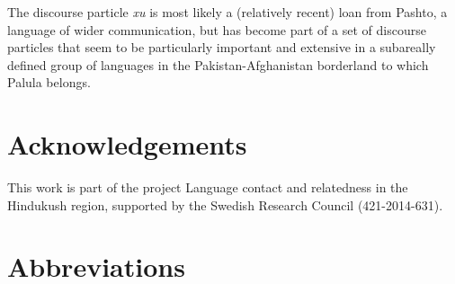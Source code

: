 \documentclass[output=paper]{langsci/langscibook}
\begin{document}
The discourse particle \textit{xu} is most likely a (relatively recent) loan from Pashto, a language of wider communication, but has become part of a set of discourse particles that seem to be particularly important and extensive in a subareally defined group of languages in the Pakistan-Afghanistan borderland to which Palula belongs.

\section*{Acknowledgements}
This work is part of the project Language contact and relatedness in the Hindukush region, supported by the Swedish Research Council (421-2014-631).
 
\clearpage
\section*{Abbreviations}
\end{document}
